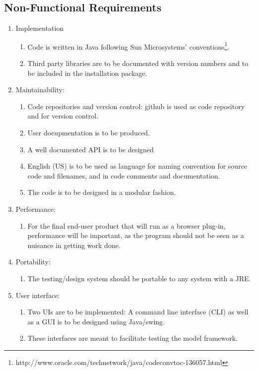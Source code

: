 \subsection{Non-Functional Requirements}
\begin{enumerate}
\item Implementation
  \begin{enumerate}
  \item Code is written in Java following Sun Microsystems' conventions\footnote{http://www.oracle.com/technetwork/java/codeconvtoc-136057.html}.
  \item Third party libraries are to be documented with version numbers and to be included in the installation package.
\end{enumerate}

\item Maintainability:
  \begin{enumerate}
  \item Code repositories and version control: github is used as code repository and for version control.
  \item User docupmentation is to be produced.
  \item A well documented API is to be designed	
  \item English (US) is to be used as language for naming convention for source code and filenames, and in code comments and documentation.
  \item The code is to be designed in a modular fashion.
  \end{enumerate}

\item Performance: 
  \begin{enumerate}
  \item For the final end-user product that will run as a browser plug-in, performance will be important, as the program should not be seen as a nuisance in getting work done.
  \end{enumerate}

\item Portability: 
  \begin{enumerate}
  \item The testing/design system should be portable to any system with a JRE.
  \end{enumerate}

\item User interface:
  \begin{enumerate}
  \item Two UIs are to be implemented: A command line interface (CLI) as well as a GUI is to be designed using Java/swing.
  \item These interfaces are meant to facilitate testing the model framework.
  \end{enumerate}
\end{enumerate}
